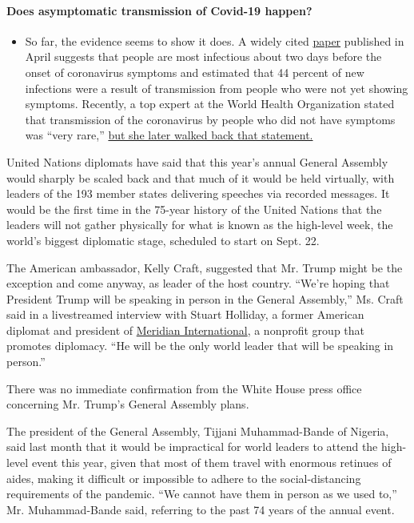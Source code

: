 \begin{itemize}
{  \paragraph{Does asymptomatic transmission of Covid-19
  happen?}\label{does-asymptomatic-transmission-of-covid-19-happen}}

  \begin{itemize}
  \tightlist
  \item
    So far, the evidence seems to show it does. A widely cited
    \href{https://www.nature.com/articles/s41591-020-0869-5}{paper}
    published in April suggests that people are most infectious about
    two days before the onset of coronavirus symptoms and estimated that
    44 percent of new infections were a result of transmission from
    people who were not yet showing symptoms. Recently, a top expert at
    the World Health Organization stated that transmission of the
    coronavirus by people who did not have symptoms was ``very rare,''
    \href{https://www.nytimes.com/2020/06/09/world/coronavirus-updates.html?action=click\&pgtype=Article\&state=default\&region=MAIN_CONTENT_3\&context=storylines_faq\#link-1f302e21}{but
    she later walked back that statement.}
  \end{itemize}
\end{itemize}

United Nations diplomats have said that this year's annual General
Assembly would sharply be scaled back and that much of it would be held
virtually, with leaders of the 193 member states delivering speeches via
recorded messages. It would be the first time in the 75-year history of
the United Nations that the leaders will not gather physically for what
is known as the high-level week, the world's biggest diplomatic stage,
scheduled to start on Sept. 22.

The American ambassador, Kelly Craft, suggested that Mr. Trump might be
the exception and come anyway, as leader of the host country. ``We're
hoping that President Trump will be speaking in person in the General
Assembly,'' Ms. Craft said in a livestreamed interview with Stuart
Holliday, a former American diplomat and president of
\href{https://www.meridian.org/}{Meridian International}, a nonprofit
group that promotes diplomacy. ``He will be the only world leader that
will be speaking in person.''

There was no immediate confirmation from the White House press office
concerning Mr. Trump's General Assembly plans.

The president of the General Assembly, Tijjani Muhammad-Bande of
Nigeria, said last month that it would be impractical for world leaders
to attend the high-level event this year, given that most of them travel
with enormous retinues of aides, making it difficult or impossible to
adhere to the social-distancing requirements of the pandemic. ``We
cannot have them in person as we used to,'' Mr. Muhammad-Bande said,
referring to the past 74 years of the annual event.

